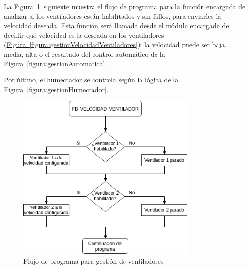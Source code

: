 \clearpage

La \hyperref[figura:gestionVentiladores]{Figura~\ref{figura:gestionVentiladores}~siguiente} muestra el flujo de programa para la función encargada de analizar si los ventiladores están habilitados y sin fallos, para enviarles la velocidad deseada. Esta función será llamada desde el módulo encargado de decidir qué velocidad es la deseada en los ventiladores (\hyperref[figura:gestionVelocidadVentiladores]{Figura~\ref{figura:gestionVelocidadVentiladores}}): la velocidad puede ser baja, media, alta o el resultado del control automático de la \hyperref[figura:gestionAutomatica]{Figura~\ref{figura:gestionAutomatica}}. 

Por último, el humectador se controla según la lógica de la \hyperref[figura:gestionHumectador]{Figura~\ref{figura:gestionHumectador}}.


\vspace*{\fill}

\begin{figure}[H]
    \centering
    \includegraphics[width=0.8\textwidth, keepaspectratio]{img/0-fbVelocidadVentilador}
    \caption{Flujo de programa para gestión de ventiladores}
    \label{figura:gestionVentiladores}
\end{figure}

   \vspace*{\fill}


\clearpage 

   \vspace*{\fill}

